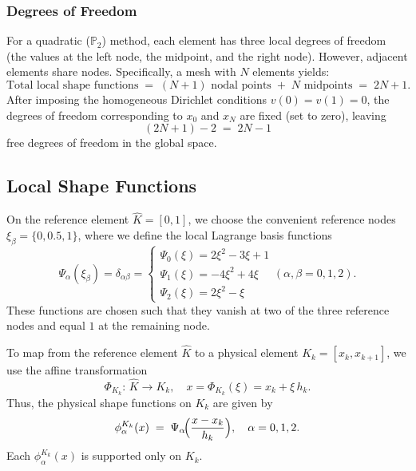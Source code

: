 \documentclass[a4paper,10pt]{article}
\begin{document}
\subsubsection{Degrees of Freedom}
For a quadratic ($\mathbb{P}_2$) method, each element has three local degrees of freedom (the values at the left node, the midpoint, and the right node). However, adjacent elements share nodes. Specifically, a mesh with $N$ elements yields:
\[
	\text{Total local shape functions} \;=\; (N+1) \text{ nodal points} \;+\; N \text{ midpoints} \;=\; 2N+1.
\]
After imposing the homogeneous Dirichlet conditions $v(0)=v(1)=0$, the degrees of freedom corresponding to $x_0$ and $x_N$ are fixed (set to zero), leaving
\[
	(2N+1)-2 \;=\; 2N-1
\]
free degrees of freedom in the global space.

\subsection{Local Shape Functions}
On the reference element $\widehat{K}=[0,1]$, we choose the convenient reference nodes \(\xi_\beta=\{0,0.5,1\}\), where we define the local Lagrange basis functions
\[
	\Psi_{\alpha}(\xi_{\beta})
	= \delta_{\alpha\beta} =
	\begin{cases}
		\Psi_0(\xi) = 2\xi^2-3\xi+1 \\
		\Psi_1(\xi) = -4\xi^2+4\xi  \\
		\Psi_2(\xi) = 2\xi^2-\xi
	\end{cases} (\alpha,\beta=0,1,2).
\]
These functions are chosen such that they vanish at two of the three reference nodes and equal $1$ at the remaining node.

To map from the reference element $\widehat{K}$ to a physical element $K_k=[x_k,x_{k+1}]$, we use the affine transformation
\[
	\Phi_{K_k}:\,\widehat{K}\to K_k,\quad x=\Phi_{K_k}(\xi)=x_k+\xi\,h_k.
\]
Thus, the physical shape functions on $K_k$ are given by
\[
	\phi_{\alpha}^{K_k}(x) \;=\; \Psi_{\alpha}\!\Bigl(\frac{x-x_k}{h_k}\Bigr),\quad \alpha=0,1,2.
\]
Each $\phi_{\alpha}^{K_k}(x)$ is supported only on $K_k$.
\end{document}
